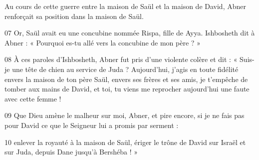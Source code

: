 Au cours de cette guerre entre la maison de Saül et la maison de David, Abner renforçait sa position dans la maison de Saül.

07 Or, Saül avait eu une concubine nommée Rispa, fille de Ayya. Ishbosheth dit à Abner : « Pourquoi es-tu allé vers la concubine de mon père ? »

08 À ces paroles d’Ishbosheth, Abner fut pris d’une violente colère et dit : « Suis-je une tête de chien au service de Juda ? Aujourd’hui, j’agis en toute fidélité envers la maison de ton père Saül, envers ses frères et ses amis, je t’empêche de tomber aux mains de David, et toi, tu viens me reprocher aujourd’hui une faute avec cette femme !

09 Que Dieu amène le malheur sur moi, Abner, et pire encore, si je ne fais pas pour David ce que le Seigneur lui a promis par serment :

10 enlever la royauté à la maison de Saül, ériger le trône de David sur Israël et sur Juda, depuis Dane jusqu’à Bershéba ! »
